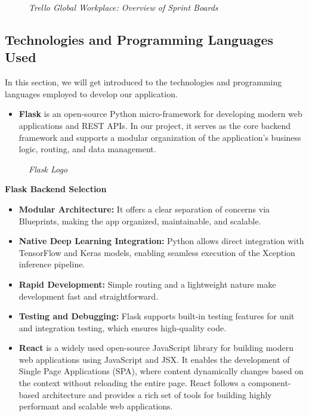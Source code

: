 \begin{figure}[H]
	\centering
	\caption{\textit{Trello Global Workplace: Overview of Sprint Boards}}
	\label{fig:trello_workspace}
\end{figure}

\subsection{Technologies and Programming Languages Used}
In this section, we will get introduced to the technologies and programming languages employed to develop our application.

\begin{itemize}
	\item \textbf{Flask} is an open-source Python micro-framework for developing modern web applications and REST APIs. In our project, it serves as the core backend framework and supports a modular organization of the application's business logic, routing, and data management.
\end{itemize}

\begin{figure}[H]
	\centering
	\caption{\textit{Flask Logo}}
\end{figure}

\textbf{\textbf{Flask Backend Selection}}
\begin{itemize}
	\item[\textbf{o}] \textbf{Modular Architecture:} It offers a clear separation of concerns via Blueprints, making the app organized, maintainable, and scalable.
	\item[\textbf{o}] \textbf{Native Deep Learning Integration:} Python allows direct integration with TensorFlow and Keras models, enabling seamless execution of the Xception inference pipeline.
	\item[\textbf{o}] \textbf{Rapid Development:} Simple routing and a lightweight nature make development fast and straightforward.
	\item[\textbf{o}] \textbf{Testing and Debugging:} Flask supports built-in testing features for unit and integration testing, which ensures high-quality code.
\end{itemize}

\begin{itemize}
	\item \textbf{React} is a widely used open-source JavaScript library for building modern web applications using JavaScript and JSX. It enables the development of Single Page Applications (SPA), where content dynamically changes based on the context without reloading the entire page. React follows a component-based architecture and provides a rich set of tools for building highly performant and scalable web applications.
\end{itemize}

